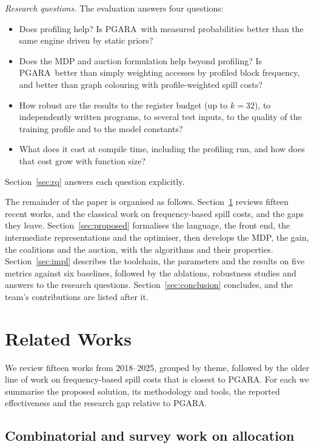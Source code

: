 \documentclass{ieeeaccess}
\newcommand{\MG}{PGARA}
\begin{document}
\textit{Research questions.} The evaluation answers four questions:
\begin{itemize}
\item[RQ1] Does profiling help? Is \MG\ with measured probabilities
better than the same engine driven by static priors?
\item[RQ2] Does the MDP and auction formulation help beyond profiling?
Is \MG\ better than simply weighting accesses by profiled block
frequency, and better than graph colouring with profile-weighted
spill costs?
\item[RQ3] How robust are the results to the register budget (up to
$k=32$), to independently written programs, to several test inputs, to
the quality of the training profile and to the model constants?
\item[RQ4] What does it cost at compile time, including the profiling
run, and how does that cost grow with function size?
\end{itemize}
Section~\ref{sec:rq} answers each question explicitly.

The remainder of the paper is organised as follows.
Section~\ref{sec:related} reviews fifteen recent works, and the
classical work on frequency-based spill costs, and the gaps they leave. Section~\ref{sec:proposed} formalises the language, the front
end, the intermediate representations and the optimiser, then develops
the MDP, the gain, the coalitions and the auction, with the algorithms
and their properties. Section~\ref{sec:impl} describes the toolchain,
the parameters and the results on five metrics against six baselines,
followed by the ablations, robustness studies and answers to the
research questions.
Section~\ref{sec:conclusion} concludes, and the team's contributions are
listed after it.

\section{Related Works}
\label{sec:related}

We review fifteen works from 2018--2025, grouped by theme, followed by
the older line of work on frequency-based spill costs that is closest
to \MG. For each we summarise the proposed solution, its methodology
and tools, the reported effectiveness and the research gap relative to
\MG.

\subsection{Combinatorial and survey work on allocation}
\end{document}
